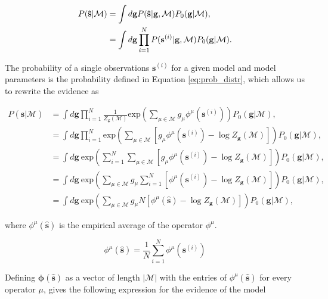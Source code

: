 \begin{align}
    P(\mathbf{\hat{s}}|\mathcal{M}) &= \int d\mathbf{g} P(\mathbf{\hat{s}} | \mathbf{g}, \mathcal{M}) P_0(\mathbf{g}|\mathcal{M}), \\
    &= \int d\mathbf{g} \prod_{i=1}^N P(\mathbf{s}^{(i)} | \mathbf{g}, \mathcal{M}) P_0(\mathbf{g}|\mathcal{M}). \notag
\end{align}

\noindent
The probability of a single observations $\mathbf{s}^{(i)}$ for a given model and model parameters is the probability defined in Equation \ref{eq:prob_distr}, which allows us to rewrite the evidence as

\begin{align*}
    P(\mathbf{\hat{s}}|\mathcal{M}) &= \int d\mathbf{g} \prod_{i=1}^N \frac{1}{Z_\mathbf{g}(\mathcal{M})} \text{exp}\left(\sum_{\mu \in \mathcal{M}} g_\mu \phi^\mu(\mathbf{s}^{(i)}) \right) P_0(\mathbf{g}|\mathcal{M}), \\
    &= \int d\mathbf{g} \prod_{i=1}^N \text{exp}\left(\sum_{\mu \in \mathcal{M}} \left[ g_\mu \phi^\mu(\mathbf{s}^{(i)}) - \log {Z_\mathbf{g}(\mathcal{M})} \right] \right) P_0(\mathbf{g}|\mathcal{M}), \\
    &= \int d\mathbf{g} \: \text{exp}\left(\sum_{i=1}^N \sum_{\mu \in \mathcal{M}} \left[ g_\mu \phi^\mu(\mathbf{s}^{(i)}) - \log {Z_\mathbf{g}(\mathcal{M})} \right] \right) P_0(\mathbf{g}|\mathcal{M}), \\
    &= \int d\mathbf{g} \: \text{exp}\left(\sum_{\mu \in \mathcal{M}} g_\mu \sum_{i=1}^N \left[ \phi^\mu(\mathbf{s}^{(i)}) - \log {Z_\mathbf{g}(\mathcal{M})} \right] \right) P_0(\mathbf{g}|\mathcal{M}), \\
    &= \int d\mathbf{g} \: \text{exp}\left(\sum_{\mu \in \mathcal{M}} g_\mu N \left[ \phi^\mu(\mathbf{\hat{s}}) - \log {Z_\mathbf{g}(\mathcal{M})} \right] \right) P_0(\mathbf{g}|\mathcal{M}),
\end{align*}

\noindent
where $\phi^\mu(\mathbf{\hat{s}})$ is the empirical average of the operator $\phi^\mu$.

\begin{equation}
    \phi^\mu(\mathbf{\hat{s}}) = \frac{1}{N} \sum_{i=1}^N \phi^\mu(\mathbf{s}^{(i)})
\end{equation}

\noindent
Defining $\mathbf{\phi}(\mathbf{\hat{s}})$ as a vector of length $|\mathcal{M}|$ with the entries of $\phi^\mu(\mathbf{\hat{s}})$ for every operator $\mu$, gives the following expression for the evidence of the model

